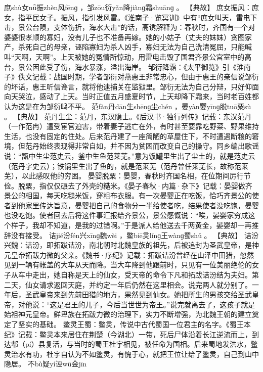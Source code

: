 \documentclass[12pt,UTF8]{ctexbook}
\begin{document}
庶shù女nǚ振zhèn风fēnɡ
，邹zōu衍yǎn降jiànɡ霜shuānɡ
。
【典故】
庶女振风：庶女，指平民女子。振风，指引发风雷。《淮南子·览冥训》中有“庶女叫天，雷电下击，景公台陨，支体伤折，海水大击”的话，高诱解释为：春秋时，齐国有一个对婆婆很孝顺的寡妇，没有儿子也不准备再嫁。她的小姑子（丈夫的妹妹）贪图家产，杀死自己的母亲，诬陷寡妇为杀人凶手，寡妇无法为自己洗清冤屈，只能喊叫“天啊，天啊”。上天被她的冤情所惊动，用雷电击毁了国君齐景公宫室中的高台，景公因此受了伤，海水暴涨，溢出海岸。
邹衍降霜：《太平御览》引《淮南子》佚文记载：战国时期，学者邹衍对燕惠王非常忠心，但由于惠王的亲信说邹衍的坏话，惠王听信谗言，就将他逮捕关在监狱里。邹衍无法为自己分辩，只好仰面向天哭泣，感动了上天。当时正值五月盛夏时节，上天却降下霜来，当时老百姓都认为这是在为邹衍鸣不平。
范fàn丹dān生shēnɡ尘chén
，晏yàn婴yīnɡ脱tuō粟sù
。
【典故】
范丹生尘：范丹，东汉隐士。《后汉书·独行列传》记载：东汉范丹（一作范冉）遭受宦官迫害，带着妻子逃亡在外，有时甚至要靠吃野菜、野果维持生活，也没有固定的住处。后来范丹建了一座简陋的草屋住下，不时遭遇断粮的窘境，但范丹始终表现得非常自如，并不因为贫困而改变自己的操守。同乡编出歌谣说：“甑中生尘范史云，釜中生鱼范莱芜。”意为饭罐里生出了尘土的，就是范史云（范丹字史云）；铁锅里生出了鱼的，就是范莱芜（范丹曾任莱芜长，故称范莱芜），以此感叹他的穷困。
晏婴脱粟：晏婴，春秋时齐国名相，在位期间厉行节俭。脱粟，指仅仅碾去了外壳的糙米。《晏子春秋·内篇·杂下》记载：晏婴做齐景公的相国，每天吃糙米饭，穿粗布衣服。有一次晏婴正在吃饭，恰巧齐景公的使者到他家里传达旨意，晏婴把自己的食物分一半给使者吃，结果使者没吃饱，晏婴也没吃饱。使者回去后将这件事汇报给齐景公，景公感慨说：“唉，晏婴家穷成这个样子，我却不知道，是我的过错啊。”于是派人给他送去千两黄金，晏婴却一再推辞没有接受。
诘jié汾fén兴xīnɡ魏wèi
，鳖biē灵línɡ王wànɡ蜀shǔ
。
【典故】
诘汾兴魏：诘汾，即拓跋诘汾，南北朝时北魏皇族的祖先，后被追封为圣武皇帝，是神元皇帝拓跋力微的父亲。《魏书·序纪》记载：拓跋诘汾曾经在山泽中田猎，忽然见到一辆有帐盖的大车从天而降。当大车降到他跟前时，只见有一位美丽绝伦的女子从车中走出，她自称是天上的仙女，受天帝的命令下凡和拓跋诘汾结为夫妇。第二天，仙女请求返回天庭，并约定一年后仍然在这里相会。说完两人就分别了。一年后，圣武皇帝来到先前田猎的地方，果然见到仙女。她把所生的男孩交给圣武皇帝，对他说：“这是君王的儿子，今后当世世为帝王。”说完就离去了，这孩子就是始祖神元皇帝。鲜卑族在拓跋力微的治理下，实力不断增强，为北魏王朝的建立奠定了坚实的基础。
鳖灵王蜀：鳖灵，传说中古代蜀国一位君主的名字。《蜀王本纪》记载：鳖灵本来居住在荆楚（今湖北）一带，死后尸体沿着长江逆流而上，到达郫（pí）县复活，与当时的蜀王杜宇相见，被任命为国相。后来蜀地发洪水，鳖灵治水有功，杜宇自认为不如鳖灵，有愧于心，就把王位让给了鳖灵，自己到山中隐居。
不bù疑yí诬wū金jīn
\end{document}
